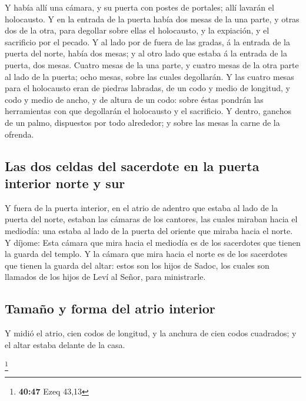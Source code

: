  Y había allí una cámara, y su puerta con postes de
portales; allí lavarán el holocausto.  Y en la entrada de
la puerta había dos mesas de la una parte, y otras dos de la otra, para
degollar sobre ellas el holocausto, y la expiación, y el sacrificio por
el pecado.  Y al lado por de fuera de las gradas, á la
entrada de la puerta del norte, había dos mesas; y al otro lado que
estaba á la entrada de la puerta, dos mesas.  Cuatro mesas
de la una parte, y cuatro mesas de la otra parte al lado de la puerta;
ocho mesas, sobre las cuales degollarán.  Y las cuatro
mesas para el holocausto eran de piedras labradas, de un codo y medio de
longitud, y codo y medio de ancho, y de altura de un codo: sobre éstas
pondrán las herramientas con que degollarán el holocausto y el
sacrificio.  Y dentro, ganchos de un palmo, dispuestos por
todo alrededor; y sobre las mesas la carne de la ofrenda.

\hypertarget{las-dos-celdas-del-sacerdote-en-la-puerta-interior-norte-y-sur}{%
\subsection{Las dos celdas del sacerdote en la puerta interior norte y
sur}\label{las-dos-celdas-del-sacerdote-en-la-puerta-interior-norte-y-sur}}

 Y fuera de la puerta interior, en el atrio de adentro que
estaba al lado de la puerta del norte, estaban las cámaras de los
cantores, las cuales miraban hacia el mediodía: una estaba al lado de la
puerta del oriente que miraba hacia el norte.  Y díjome:
Esta cámara que mira hacia el mediodía es de los sacerdotes que tienen
la guarda del templo.  Y la cámara que mira hacia el norte
es de los sacerdotes que tienen la guarda del altar: estos son los hijos
de Sadoc, los cuales son llamados de los hijos de Leví al Señor, para
ministrarle.

\hypertarget{tamauxf1o-y-forma-del-atrio-interior}{%
\subsection{Tamaño y forma del atrio
interior}\label{tamauxf1o-y-forma-del-atrio-interior}}

 Y midió el atrio, cien codos de longitud, y la anchura de
cien codos cuadrados; y el altar estaba delante de la casa.

\footnote{\textbf{40:47} Ezeq 43,13}

